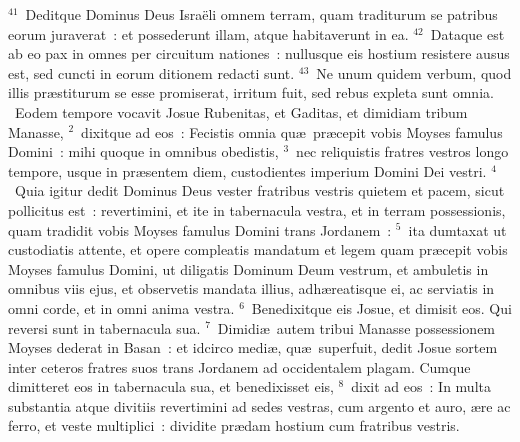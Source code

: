 ${}^{41}$~Deditque Dominus Deus Isra\"eli omnem terram, quam traditurum se patribus eorum juraverat~: et possederunt illam, atque habitaverunt in ea.
${}^{42}$~Dataque est ab eo pax in omnes per circuitum nationes~: nullusque eis hostium resistere ausus est, sed cuncti in eorum ditionem redacti sunt.
${}^{43}$~Ne unum quidem verbum, quod illis pr\ae stiturum se esse promiserat, irritum fuit, sed rebus expleta sunt omnia.
~\lettrine[lines=10,image=true,loversize=0.05,lraise=-0.03]{E}{}odem tempore vocavit Josue Rubenitas, et Gaditas, et dimidiam tribum Manasse,
${}^{2}$~dixitque ad eos~: Fecistis omnia qu\ae\ pr\ae cepit vobis Moyses famulus Domini~: mihi quoque in omnibus obedistis,
${}^{3}$~nec reliquistis fratres vestros longo tempore, usque in pr\ae sentem diem, custodientes imperium Domini Dei vestri.
${}^{4}$~Quia igitur dedit Dominus Deus vester fratribus vestris quietem et pacem, sicut pollicitus est~: revertimini, et ite in tabernacula vestra, et in terram possessionis, quam tradidit vobis Moyses famulus Domini trans Jordanem~:
${}^{5}$~ita dumtaxat ut custodiatis attente, et opere compleatis mandatum et legem quam pr\ae cepit vobis Moyses famulus Domini, ut diligatis Dominum Deum vestrum, et ambuletis in omnibus viis ejus, et observetis mandata illius, adh\ae reatisque ei, ac serviatis in omni corde, et in omni anima vestra.
${}^{6}$~Benedixitque eis Josue, et dimisit eos. Qui reversi sunt in tabernacula sua.
${}^{7}$~Dimidi\ae\ autem tribui Manasse possessionem Moyses dederat in Basan~: et idcirco medi\ae , qu\ae\ superfuit, dedit Josue sortem inter ceteros fratres suos trans Jordanem ad occidentalem plagam. Cumque dimitteret eos in tabernacula sua, et benedixisset eis,
${}^{8}$~dixit ad eos~: In multa substantia atque divitiis revertimini ad sedes vestras, cum argento et auro, \ae re ac ferro, et veste multiplici~: dividite pr\ae dam hostium cum fratribus vestris.


